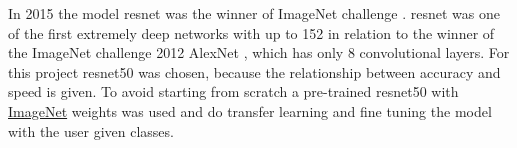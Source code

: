 \documentclass[../ImageClassifier.tex]{subfiles}
\begin{document}
    In 2015 the model \ac{resnet} \autocite{resnet} was the winner of ImageNet challenge \parencite{ILSVRC15}.
    \ac{resnet} was one of the first extremely deep networks with up to 152 in relation to the winner of the ImageNet challenge 2012 AlexNet \autocite{alexnet}, which has only 8 convolutional layers.
    For this project \ac{resnet50} was chosen, because the relationship between accuracy and speed is given.
    To avoid starting from scratch a pre-trained \ac{resnet50} with \href{http://www.image-net.org}{ImageNet} weights was used and do transfer learning and fine tuning the model with the user given classes.
\end{document}
